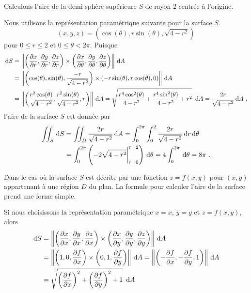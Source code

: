 {

\begin{egg}
Calculons l'aire de la demi-sphère supérieure $S$ de rayon
$2$ centrée à l'origine.

Nous utilisons la représentation paramétrique suivante pour la surface $S$.
\[
  (x,y,z) = (\cos(\theta), r\sin(\theta), \sqrt{4 - r^2})
\]
pour $0 \leq r \leq 2$ et $0 \leq \theta < 2\pi$.  Puisque
\begin{align*}
\,\mathrm{d}S &= \left\| \left( \frac{\partial x}{\partial r} , \frac{\partial y}{\partial r} , \frac{\partial z}{\partial r} \right)
\times
\left( \frac{\partial x}{\partial \theta} , \frac{\partial y}{\partial \theta} , \frac{\partial z}{\partial \theta} \right) 
\right\| \,\mathrm{d}A\\
&= \left\| \left(\cos(\theta) , \sin(\theta) , \frac{-r}{\sqrt{4-r^2}} \right)
\times
\left( -r\sin(\theta) , r \cos(\theta) , 0 \right) \right\| \,\mathrm{d}A\\
&= \left\| \left( \frac{r^2 \cos(\theta)}{\sqrt{4 - r^2}} ,
\frac{r^2 \sin(\theta)}{\sqrt{4 - r^2}} , r \right) \right\| \,\mathrm{d}A
= \sqrt{ \frac{r^4 \cos^2(\theta)}{4 - r^2} +
\frac{r^4 \sin^2(\theta)}{4 - r^2} + r^2}\ \,\mathrm{d}A
= \frac{2r}{\sqrt{4 - r^2}} \,\mathrm{d}A \ ,
\end{align*}
l'aire de la surface $S$ est donnée par
\begin{align*}
\iint_S \,\mathrm{d}S &= \iint_D \frac{2r}{\sqrt{4 - r^2}} \,\mathrm{d}A
= \int_0^{2\pi} \int_0^2 \frac{2r}{\sqrt{4 - r^2}} \,\mathrm{d}r \,\mathrm{d}\theta \\
&= \int_0^{2\pi} \left( -2\sqrt{4 - r^2}\bigg|_{r=0}^{r=2}\right) \,\mathrm{d}\theta
= 4 \int_0^{2\pi} \,\mathrm{d}\theta = 8 \pi \ .
\end{align*}
\end{egg}

Dans le cas où la surface $S$ est décrite par une fonction $z = f(x,y)$
pour $(x,y)$ appartenant à une région $D$ du plan.  La formule pour
calculer l'aire de la surface prend une forme simple.

Si nous choisissons la représentation paramétrique $x = x$, $y = y$ et
$z = f(x,y)$, alors
\begin{align*}
\,\mathrm{d}S &= \left\| \left( \frac{\partial x}{\partial x} , \frac{\partial y}{\partial x} , \frac{\partial z}{\partial x} \right)
\times
\left( \frac{\partial x}{\partial y} , \frac{\partial y}{\partial y} , \frac{\partial z}{\partial y} \right) 
\right\| \,\mathrm{d}A\\
&= \left\| \left(1, 0, \frac{\partial f}{\partial x} \right)
\times
\left( 0, 1, \frac{\partial f}{\partial y} \right) \right\| \,\mathrm{d}A
= \left\| \left( -\frac{\partial f}{\partial x}, -\frac{\partial f}{\partial y}, 1 \right) \right\| \,\mathrm{d}A\\
&= \sqrt{ \left(\frac{\partial f}{\partial x}\right)^2 + \left(\frac{\partial f}{\partial y}\right)^2
+ 1}\ \,\mathrm{d}A
\end{align*}

}
